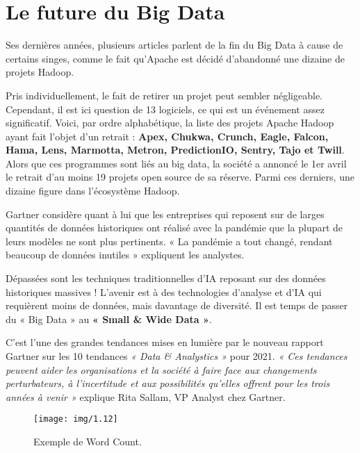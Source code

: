 \section{Le future du Big Data}
Ses dernières années, plusieurs articles parlent de la fin du Big Data à cause de certains singes, comme le fait qu’Apache est décidé d’abandonné une dizaine de projets Hadoop.

Pris individuellement, le fait de retirer un projet peut sembler négligeable. Cependant, il est ici question de 13 logiciels, ce qui est un événement assez significatif. Voici, par ordre alphabétique, la liste des projets Apache Hadoop ayant fait l’objet d’un retrait : \textbf{Apex, Chukwa, Crunch, Eagle, Falcon, Hama, Lens, Marmotta, Metron, PredictionIO, Sentry, Tajo et Twill}. Alors que ces programmes sont liés au big data, la société a annoncé le 1er avril le retrait d’au moins 19 projets open source de sa réserve. Parmi ces derniers, une dizaine figure dans l’écosystème Hadoop.

Gartner considère quant à lui que les entreprises qui reposent sur de larges quantités de données historiques ont réalisé avec la pandémie que la plupart de leurs modèles ne sont plus pertinents. « La pandémie a tout changé, rendant beaucoup de données inutiles » expliquent les analystes.

Dépassées sont les techniques traditionnelles d’IA reposant sur des données historiques massives ! L’avenir est à des technologies d’analyse et d’IA qui requièrent moins de données, mais davantage de diversité. Il est temps de passer du « Big Data » au \textbf{« Small \& Wide Data »}.

C’est l’une des grandes tendances mises en lumière par le nouveau rapport Gartner sur les 10 tendances \textit{ « Data \& Analystics »} pour 2021. \textit{ « Ces tendances peuvent aider les organisations et la société à faire face aux changements perturbateurs, à l’incertitude et aux possibilités qu’elles offrent pour les trois années à venir »} explique Rita Sallam, VP Analyst chez Gartner.

\begin{figure}[h]
	\centering
	\texttt{[image: img/1.12]}
	\caption{Exemple de Word Count.}
\end{figure}